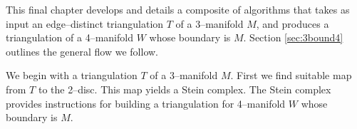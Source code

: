 This final chapter develops and details a composite of algorithms that takes as input an edge--distinct triangulation $T$ of a 3--manifold $M$, and produces a triangulation of a 4--manifold $W$ whose boundary is $M$.
Section \ref{sec:3bound4} outlines the general flow we follow.

We begin with a triangulation $T$ of a 3--manifold $M$.
First we find suitable map from $T$ to the 2--disc.
This map yields a Stein complex.
The Stein complex provides instructions for building a triangulation for 4--manifold $W$ whose boundary is $M$.